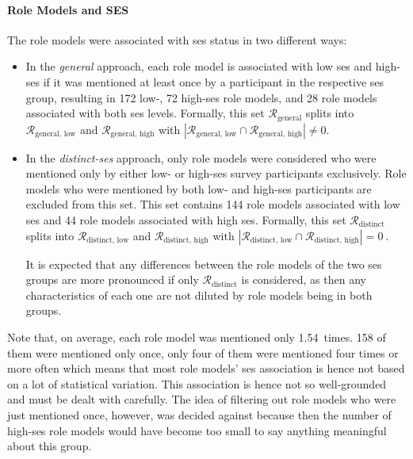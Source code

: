 \paragraph{Role Models and SES}
The role models were associated with \gls{ses} status in two different ways:
\begin{itemize}
    \item In the \textit{general} approach, each role model is associated with low \gls{ses} and high-\gls{ses} if it was mentioned at least once by a participant in the respective \gls{ses} group, resulting in \SI{172}{} low-, \SI{72}{} high-\gls{ses} role models, and \SI{28}{} role models associated with both \gls{ses} levels. Formally, this set $\mathcal{R}_\text{general}$ splits into $\mathcal{R}_\text{general, low}$ and $\mathcal{R}_\text{general, high}$ with $\left|\mathcal{R}_\text{general, low} \cap \mathcal{R}_\text{general, high}\right| \neq 0$.

    \item In the \textit{distinct-\gls{ses}} approach, only role models were considered who were mentioned only by either low- or high-\gls{ses} survey participants exclusively. Role models who were mentioned by both low- and high-\gls{ses} participants are excluded from this set. This set contains \SI{144}{} role models associated with low \gls{ses} and \SI{44}{} role models associated with high \gls{ses}. Formally, this set $\mathcal{R}_\text{distinct}$ splits into $\mathcal{R}_\text{distinct, low}$ and $\mathcal{R}_\text{distinct, high}$ with $\left|\mathcal{R}_\text{distinct, low} \cap \mathcal{R}_\text{distinct, high}\right| = \SI{0}{}$.
    
    It is expected that any differences between the role models of the two \gls{ses} groups are more pronounced if only $\mathcal{R}_\text{distinct}$ is considered, as then any characteristics of each one are not diluted by role models being in both groups.
\end{itemize}

Note that, on average, each role model was mentioned only \SI{1.54}{times}. \SI{158}{} of them were mentioned only once, only four of them were mentioned four times or more often which means that most role models' \gls{ses} association is hence not based on a lot of statistical variation. This association is hence not so well-grounded and must be dealt with carefully. The idea of filtering out role models who were just mentioned once, however, was decided against because then the number of high-\gls{ses} role models would have become too small to say anything meaningful about this group.


